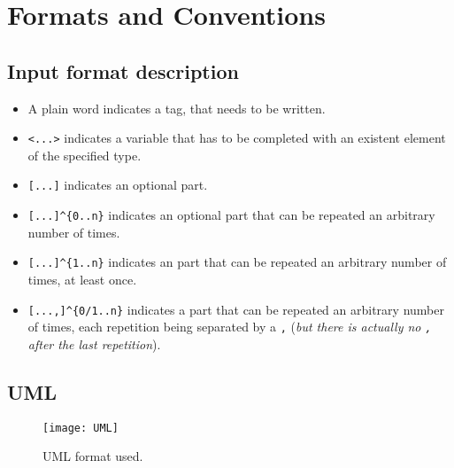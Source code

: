 
\section{Formats and Conventions}

\subsection{Input format description}

\begin{itemize}
  \item A plain word indicates a tag, that needs to be written.
  \item \texttt{<...>} indicates a variable that has to be completed with an existent element of the specified type.
  \item \texttt{[...]} indicates an optional part.
  \item \texttt{[...]\^{}\{0..n\}} indicates an optional part that can be repeated an arbitrary number of times.
  \item \texttt{[...]\^{}\{1..n\}} indicates an part that can be repeated an arbitrary number of times, at least once.
  \item \texttt{[...,]\^{}\{0/1..n\}} indicates a part that can be repeated an arbitrary number of times, each repetition being separated by a \texttt{,} (\emph{but there is actually no \texttt{,} after the last repetition}).
\end{itemize}

\subsection{UML}

\begin{figure}[!h]
  \centering
  \texttt{[image: UML]}
  \caption{UML format used.}
  \label{fig:UML}
\end{figure}


